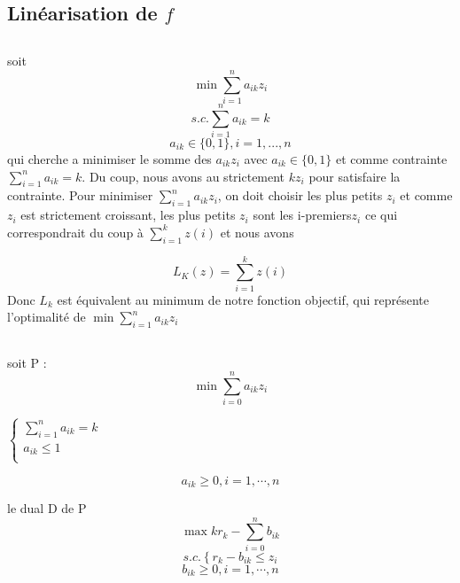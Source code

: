 \documentclass[16pt, a4paper]{article}
\begin{document}
\begin{flushleft}
\newpage

\pagestyle{fancy}

\fancyhf{}  
\rfoot{\thepage}
\rhead{}
\setcounter{tocdepth}{1}
\tableofcontents
\newpage
\begin{justify}

\section{Linéarisation de \begin{math}f\end{math}}
\setlength{\parindent}{0ex}
\subsection{}
\large{
soit 
$$ \min \sum_{i=1}^{n} a_{ik}z_i $$
$$ s.c. \sum_{i=1}^{n} a_{ik} = k $$
$$ a_{ik}\in{\{0,1\}}, i = 1,...,n $$
qui cherche a minimiser le somme des $ a_{ik}z_i $ avec $ a_{ik}\in{\{0,1\}} $ et comme contrainte $\sum_{i=1}^{n} a_{ik} = k $. Du coup, nous avons au strictement $k z_i$ pour satisfaire la contrainte. Pour minimiser $ \sum_{i=1}^{n} a_{ik}z_i $, on doit choisir les plus petits $z_i$ et comme $ z_i $ est strictement croissant, les plus petits $z_i$ sont les i-premiers$ z_i$ ce qui correspondrait du coup à $\sum_{i=1}^k z(i) $ et nous avons

$$ L_K (z)  = \sum_{i=1}^k z(i) $$
Donc $L_k$ est équivalent au minimum de notre fonction objectif, qui représente l'optimalité de $ \min \sum_{i=1}^{n} a_{ik}z_i $

}


\subsection{}

soit P : 
$$
\min \sum_{i=0}^n a_{ik} z_i 
$$
\begin{center}
\begin{math}
\begin{cases}
    \sum_{i=1}^n a_{ik}=k \\
    a_{ik} \leq 1 \\
\end{cases}
\end{math}
\end{center}
$$
 a_{ik} \geq 0 , i = 1, \cdots , n
$$


le dual D de P  
$$ \max kr_{k} - \sum_{i=0}^n b_{ik}$$
$$ s.c. \left\{ r_k - b_{ik} \leq z_i \right.$$
$$b_{ik} \geq 0, i=1, \cdots, n$$



\end{justify}
\end{flushleft}
\end{document}
